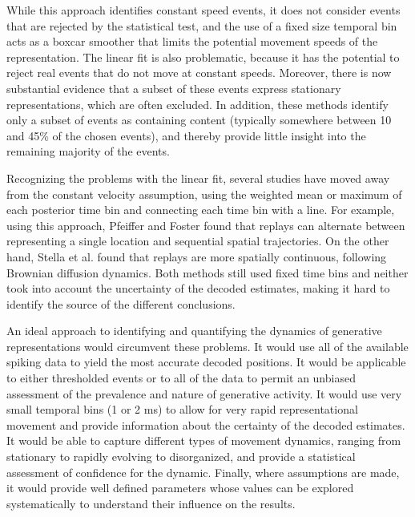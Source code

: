 \documentclass[times, twoside]{zHenriquesLab-StyleBioRxiv}
\begin{document}
While this approach identifies constant speed events, it does not consider events that are rejected by the statistical test, and the use of a fixed size temporal bin acts as a boxcar smoother that limits the potential movement speeds of the representation. The linear fit is also problematic, because it has the potential to reject real events that do not move at constant speeds. Moreover, there is now substantial evidence that a subset of these events express stationary representations, which are often excluded. In addition, these methods identify only a subset of events as containing content (typically somewhere between 10 and 45\% of the chosen events), and thereby provide little insight into the remaining majority of the events.

 Recognizing the problems with the linear fit, several studies have moved away from the constant velocity assumption, using the weighted mean or maximum of each posterior time bin and connecting each time bin with a line. For example, using this approach, Pfeiffer and Foster \cite{PfeifferAutoassociativedynamicsgeneration2015} found that replays can alternate between representing a single location and sequential spatial trajectories. On the other hand, Stella et al. \cite{StellaHippocampalReactivationRandom2019} found that replays are more spatially continuous, following Brownian diffusion dynamics. Both methods still used fixed time bins and neither took into account the uncertainty of the decoded estimates, making it hard to identify the source of the different conclusions.

An ideal approach to identifying and quantifying the dynamics of generative representations would circumvent these problems. It would use all of the available spiking data to yield the most accurate decoded positions. It would be applicable to either thresholded events or to all of the data to permit an unbiased assessment of the prevalence and nature of generative activity. It would use very small temporal bins (1 or 2 ms) to allow for very rapid representational movement and provide information about the certainty of the decoded estimates. It would be able to capture different types of movement dynamics, ranging from stationary to rapidly evolving to disorganized, and provide a statistical assessment of confidence for the dynamic. Finally, where assumptions are made, it would provide well defined parameters whose values can be explored systematically to understand their influence on the results.
\end{document}
